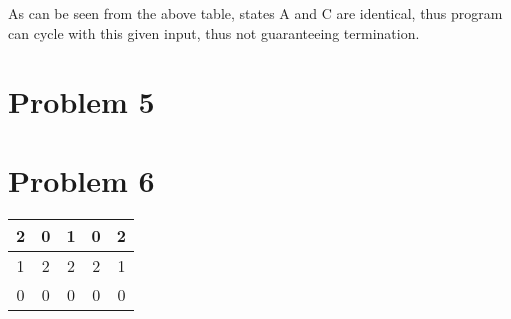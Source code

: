 \documentclass[times]{article}
\begin{document}
	As can be seen from the above table, states A and C are identical, thus program can cycle with this given input, thus not guaranteeing termination.

	\section{Problem 5}

	\section{Problem 6}

	\begin{center}
		\begin{tabular}{ |c c c c c| } 
			\hline
			2 	& 0	& 1	& 0	& 2	\\ 
			\hline
			1 	& 2	& 2	& 2	& 1	\\ 
			\hline
			0 	& 0	& 0	& 0	& 0	\\ 
			\hline
		\end{tabular}
	\end{center}
	
	
		
\end{document}
